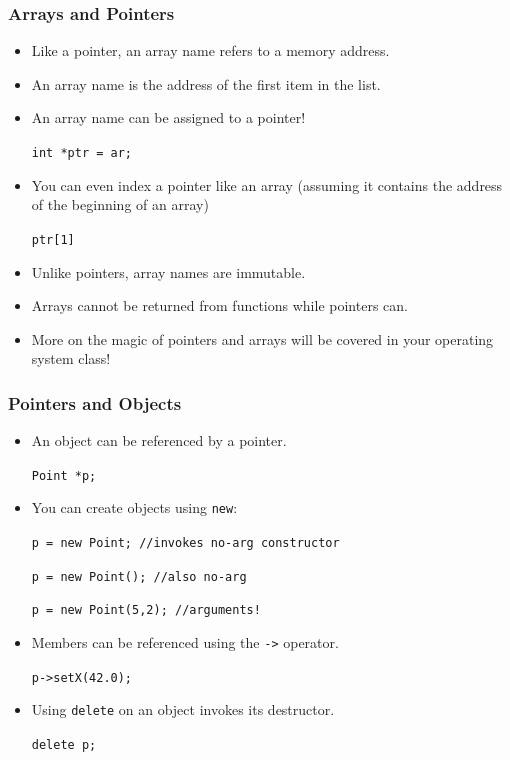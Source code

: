 \documentclass{beamer}
\begin{document}
\begin{frame}
    \frametitle{Arrays and Pointers}
    \begin{itemize}
        \item Like a pointer, an array name refers to a memory address.
        \item An array name is the address of the first item in the list.
        \item An array name can be assigned to a pointer!
            \par{\tt int *ptr = ar;}
        \item You can even index a pointer like an array (assuming it 
            contains the address of the beginning of an array)
            \par{\tt ptr[1]}
        \item Unlike pointers, array names are immutable.
        \item Arrays cannot be returned from functions while pointers can.
        \item More on the magic of pointers and arrays will be covered in
            your operating system class!
    \end{itemize}
\end{frame}


\begin{frame}
    \frametitle{Pointers and Objects}
    \begin{itemize}
        \item An object can be referenced by a pointer.
            \par{\tt Point *p;}
        \item You can create objects using {\tt new}:
            \par{\tt p = new Point; //invokes no-arg constructor}
            \par{\tt p = new Point(); //also no-arg}
            \par{\tt p = new Point(5,2); //arguments!}
        \item Members can be referenced using the {\tt ->} operator.
            \par{\tt p->setX(42.0);}
        \item Using {\tt delete} on an object invokes its destructor.
            \par{\tt delete p;}
    \end{itemize}
\end{frame}
\end{document}
